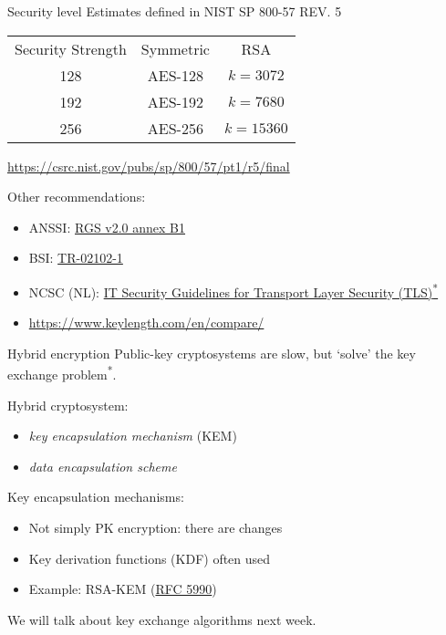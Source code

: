 \begin{frame}{Security level}
  Estimates defined in NIST SP 800-57 REV. 5

  \pause
  \begin{center}
  \begin{tabular}{|c|c|c|}
    Security Strength & Symmetric & RSA\\
    128 & AES-128 & $k = 3072$\\
    192 & AES-192 & $k = 7680$\\
    256 & AES-256 & $k = 15360$
  \end{tabular}
  \end{center}

  \pause
  \url{https://csrc.nist.gov/pubs/sp/800/57/pt1/r5/final}

  \pause
  Other recommendations:
  \begin{itemize}
    \item ANSSI: \href{https://cyber.gouv.fr/le-referentiel-general-de-securite-version-20-les-documents}{RGS v2.0 annex B1}
    \item BSI: \href{https://www.bsi.bund.de/DE/Themen/Unternehmen-und-Organisationen/Standards-und-Zertifizierung/Technische-Richtlinien/TR-nach-Thema-sortiert/tr02102/tr02102_node.html}{TR-02102-1}
    \item NCSC (NL): \href{https://english.ncsc.nl/publications/publications/2021/january/19/it-security-guidelines-for-transport-layer-security-2.1}{IT Security Guidelines for
    Transport Layer Security (TLS)\textsuperscript{*}}
    \item \url{https://www.keylength.com/en/compare/}
  \end{itemize}
\end{frame}

\begin{frame}{Hybrid encryption}
  Public-key cryptosystems are slow, but `solve' the key exchange problem\textsuperscript{*}.

  \pause
  Hybrid cryptosystem:
  \begin{itemize}[<+(1)->]
    \item \emph{key encapsulation mechanism} (KEM)
    \item \emph{data encapsulation scheme}
  \end{itemize}

  \pause
  Key encapsulation mechanisms:
  \begin{itemize}[<+(1)->]
    \item Not simply PK encryption: there are changes
    \item Key derivation functions (KDF) often used
    \item Example: RSA-KEM (\href{https://datatracker.ietf.org/doc/html/rfc5990}{RFC 5990})
  \end{itemize}

  \pause
  We will talk about key exchange algorithms next week.
\end{frame}

